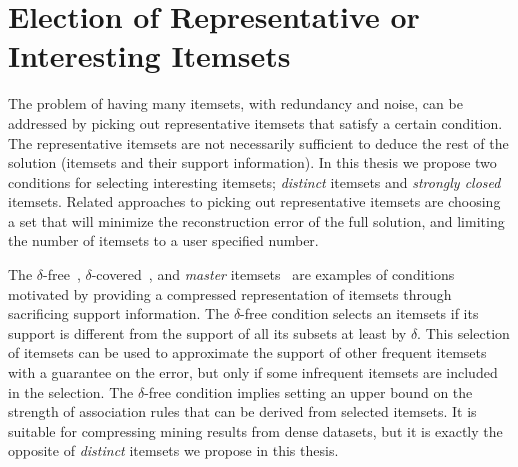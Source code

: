 \documentclass[letterpaper,12pt,titlepage,oneside,final]{book}
\begin{document}

\section{Election of Representative or Interesting Itemsets}

The problem of having many itemsets, with redundancy and noise, can be addressed by
picking out  representative itemsets that satisfy a certain condition.
The representative itemsets are not necessarily sufficient to
deduce the rest of the solution (itemsets and their support information).
In this thesis we propose two conditions for selecting interesting itemsets;
\emph{distinct} itemsets and  \emph{strongly closed} itemsets.
Related approaches to picking out representative itemsets are %
choosing a set that will minimize the reconstruction error of the full solution, 
and limiting the number of itemsets to a user specified number.



The $\delta$-free~\cite{boulicaut2003free},  
$\delta$-covered~\cite{xin2005mining}, and 
\emph{master} itemsets~\cite{yan2005summarizing} 
are examples of conditions motivated by providing a compressed representation
of itemsets through sacrificing support information.
The $\delta$-free condition selects an itemsets if its support
is different from the support of all its subsets at least by $\delta$.
This selection of itemsets can be used to approximate the support 
of other frequent itemsets with a guarantee on the error,
but only if some infrequent itemsets are included in the selection.
The $\delta$-free condition implies setting an upper bound on the
strength of association rules that can be derived from selected itemsets.
It is suitable for compressing mining results from dense datasets,
but it is exactly the opposite of \emph{distinct} itemsets we propose in this thesis.
\end{document}
